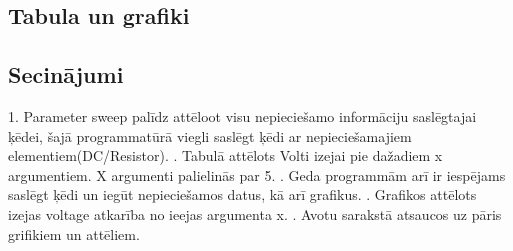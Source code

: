 \documentclass{report}
\begin{document}
\subsection{Tabula un grafiki}
\subsection{Secinājumi}
1. Parameter sweep palīdz attēloot visu nepieciešamo informāciju
saslēgtajai ķēdei, šajā programmatūrā viegli saslēgt ķēdi ar
nepieciešamajiem elementiem(DC/Resistor).
\vspace{5mm}
. Tabulā attēlots Volti izejai pie dažadiem x argumentiem. X argumenti palielinās par 5.
\vspace{5mm}
. Geda programmām arī ir iespējams saslēgt ķēdi un iegūt nepieciešamos datus, kā arī grafikus.
\vspace{5mm}
. Grafikos attēlots izejas voltage atkarība no ieejas argumenta x.
\vspace{5mm}
. Avotu sarakstā atsaucos uz pāris grifikiem un attēliem.
\listoffigures
\end{document}
